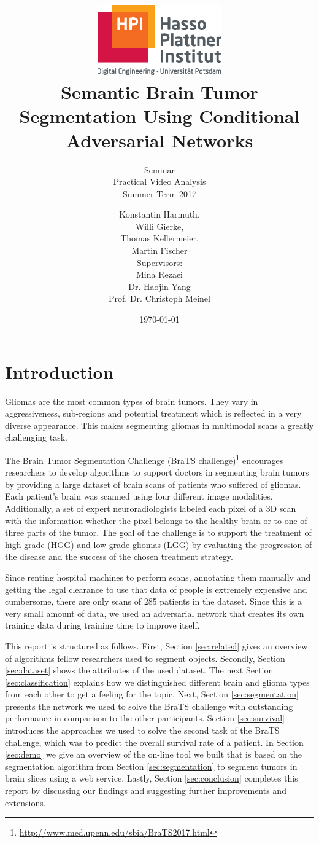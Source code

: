 \documentclass[a4paper,12pt,pagesize,headsepline,bibtotoc,titlepage]{scrartcl}
\title{
	\includegraphics*[width=0.4\textwidth]{hpi_logo_2017.eps}\\
	\vspace{24pt}
	Semantic Brain Tumor Segmentation Using Conditional Adversarial Networks
}
\subtitle{
	Seminar\\
	Practical Video Analysis\\
	Summer Term 2017
}
\author{
	Konstantin Harmuth,\\
	Willi Gierke,\\
	Thomas Kellermeier,\\
	Martin Fischer\\[12pt]
	Supervisors:\\
    Mina Rezaei\\
	Dr. Haojin Yang\\
	Prof. Dr. Christoph Meinel
}
\date{\today}
\begin{document}
\maketitle
\tableofcontents
\newpage


\section{Introduction}
Gliomas are the most common types of brain tumors.
They vary in aggressiveness, sub-regions and potential treatment which is reflected in a very diverse appearance.
This makes segmenting gliomas in multimodal scans a greatly challenging task.

The Brain Tumor Segmentation Challenge (BraTS challenge)\footnote{\url{http://www.med.upenn.edu/sbia/BraTS2017.html}} encourages researchers to develop algorithms to support doctors in segmenting brain tumors by providing a large dataset of brain scans of patients who suffered of gliomas.
Each patient's brain was scanned using four different image modalities.
Additionally, a set of expert neuroradiologists labeled each pixel of a 3D scan with the information whether the pixel belongs to the healthy brain or to one of three parts of the tumor.
The goal of the challenge is to support the treatment of high-grade (HGG) and low-grade gliomas (LGG) by evaluating the progression of the disease and the success of the chosen treatment strategy.

Since renting hospital machines to perform scans, annotating them manually and getting the legal clearance to use that data of people is extremely expensive and cumbersome, there are only scans of 285 patients in the dataset.
Since this is a very small amount of data, we used an adversarial network that creates its own training data during training time to improve itself.

This report is structured as follows.
First, Section \ref{sec:related} gives an overview of algorithms fellow researchers used to segment objects.
Secondly, Section \ref{sec:dataset} shows the attributes of the used dataset. The next Section \ref{sec:classification} explains how we distinguished different brain and glioma types from each other to get a feeling for the topic.
Next, Section \ref{sec:segmentation} presents the network we used to solve the BraTS challenge with outstanding performance in comparison to the other participants.
Section \ref{sec:survival} introduces the approaches we used to solve the second task of the BraTS challenge, which was to predict the overall survival rate of a patient.
In Section \ref{sec:demo} we give an overview of the on-line tool we built that is based on the segmentation algorithm from Section \ref{sec:segmentation} to segment tumors in brain slices using a web service.
Lastly, Section \ref{sec:conclusion} completes this report by discussing our findings and suggesting further improvements and extensions.
\end{document}
